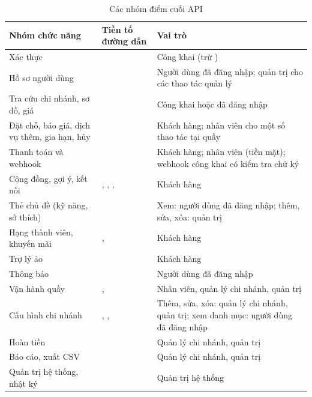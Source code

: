 \begin{table}[!htbp]
\centering
\caption{Các nhóm điểm cuối API}
\label{tab:api_nhom}
\footnotesize
\renewcommand{\arraystretch}{1.15}
\begin{tabularx}{\linewidth}{|P{3.4cm}|P{5.0cm}|L|}
\hline
\textbf{Nhóm chức năng} & \textbf{Tiền tố đường dẫn} & \textbf{Vai trò} \\
\hline
Xác thực &  & Công khai (trừ ) \\
\hline
Hồ sơ người dùng &  & Người dùng đã đăng nhập; quản trị cho các thao tác quản lý \\
\hline
Tra cứu chi nhánh, sơ đồ, giá &  & Công khai hoặc đã đăng nhập \\
\hline
Đặt chỗ, báo giá, dịch vụ thêm, gia hạn, hủy &  & Khách hàng; nhân viên cho một số thao tác tại quầy \\
\hline
Thanh toán và webhook &  & Khách hàng; nhân viên (tiền mặt); webhook công khai có kiểm tra chữ ký \\
\hline
Cộng đồng, gợi ý, kết nối & , , ,  & Khách hàng \\
\hline
Thẻ chủ đề (kỹ năng, sở thích) &  & Xem: người dùng đã đăng nhập; thêm, sửa, xóa: quản trị \\
\hline
Hạng thành viên, khuyến mãi & ,  & Khách hàng \\
\hline
Trợ lý ảo &  & Khách hàng \\
\hline
Thông báo &  & Người dùng đã đăng nhập \\
\hline
Vận hành quầy & ,  & Nhân viên, quản lý chi nhánh, quản trị \\
\hline
Cấu hình chi nhánh & , ,  & Thêm, sửa, xóa: quản lý chi nhánh, quản trị; xem danh mục: người dùng đã đăng nhập \\
\hline
Hoàn tiền &  & Quản lý chi nhánh, quản trị \\
\hline
Báo cáo, xuất CSV &  & Quản lý chi nhánh, quản trị \\
\hline
Quản trị hệ thống, nhật ký &  & Quản trị hệ thống \\
\hline
\end{tabularx}
\end{table}

